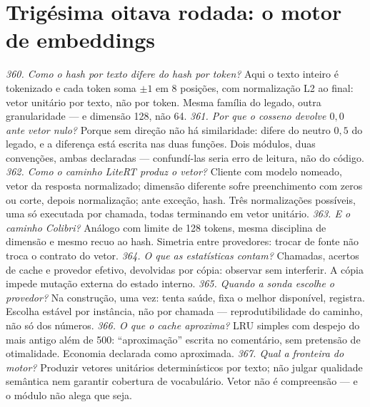 \section{Trigésima oitava rodada: o motor de embeddings}
\textit{360. Como o hash por texto difere do hash por token?} Aqui o texto inteiro é tokenizado e cada token soma $\pm1$ em 8 posições, com normalização L2 ao final: vetor unitário por texto, não por token. Mesma família do legado, outra granularidade --- e dimensão 128, não 64.
\textit{361. Por que o cosseno devolve $0{,}0$ ante vetor nulo?} Porque sem direção não há similaridade: difere do neutro $0{,}5$ do legado, e a diferença está escrita nas duas funções. Dois módulos, duas convenções, ambas declaradas --- confundí-las seria erro de leitura, não do código.
\textit{362. Como o caminho LiteRT produz o vetor?} Cliente com modelo nomeado, vetor da resposta normalizado; dimensão diferente sofre preenchimento com zeros ou corte, depois normalização; ante exceção, hash. Três normalizações possíveis, uma só executada por chamada, todas terminando em vetor unitário.
\textit{363. E o caminho Colibri?} Análogo com limite de 128 tokens, mesma disciplina de dimensão e mesmo recuo ao hash. Simetria entre provedores: trocar de fonte não troca o contrato do vetor.
\textit{364. O que as estatísticas contam?} Chamadas, acertos de cache e provedor efetivo, devolvidas por cópia: observar sem interferir. A cópia impede mutação externa do estado interno.
\textit{365. Quando a sonda escolhe o provedor?} Na construção, uma vez: tenta saúde, fixa o melhor disponível, registra. Escolha estável por instância, não por chamada --- reprodutibilidade do caminho, não só dos números.
\textit{366. O que o cache aproxima?} LRU simples com despejo do mais antigo além de 500: ``aproximação'' escrita no comentário, sem pretensão de otimalidade. Economia declarada como aproximada.
\textit{367. Qual a fronteira do motor?} Produzir vetores unitários determinísticos por texto; não julgar qualidade semântica nem garantir cobertura de vocabulário. Vetor não é compreensão --- e o módulo não alega que seja.
